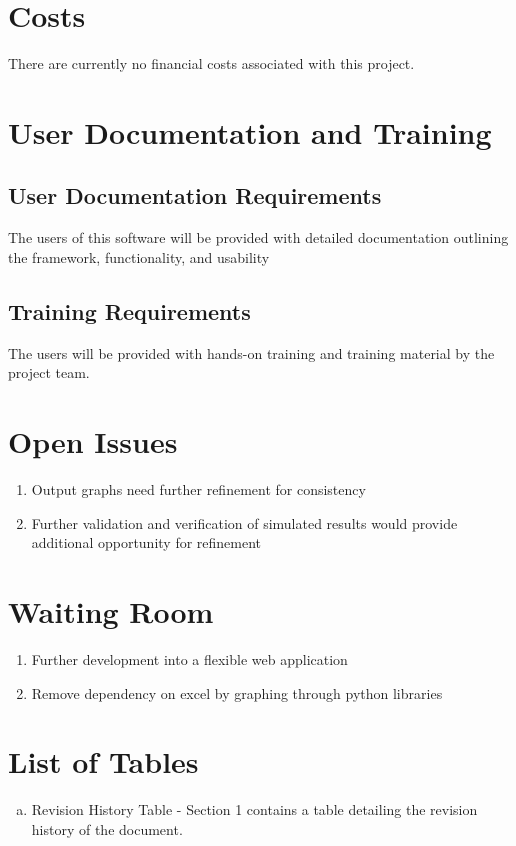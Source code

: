 \documentclass[paper=letter, fontsize=10pt]{scrartcl}
\numberwithin{equation}{section}		%
\numberwithin{figure}{section}			%
\numberwithin{table}{section}				%
\begin{document}
\section{Costs}
There are currently no financial costs associated with this project.

\section{User Documentation and Training}
\subsection{User Documentation Requirements}
The users of this software will be provided with detailed documentation outlining the framework, functionality, and usability
\subsection{Training Requirements}
The users will be provided with hands-on training and training material by the project team.

\section{Open Issues}
\begin{enumerate}
	\item Output graphs need further refinement for consistency 
	\item Further validation and verification of simulated results would provide additional opportunity for refinement 
\end{enumerate}

\section{Waiting Room}
\begin{enumerate}
	\item Further development into a flexible web application
	\item Remove dependency on excel by graphing through python libraries 
\end{enumerate}

\section{List of Tables}
\begin{enumerate}[(a)]
	\item Revision History Table - Section 1 contains a table detailing the revision history of the document.
\end{enumerate}

\end{document}
